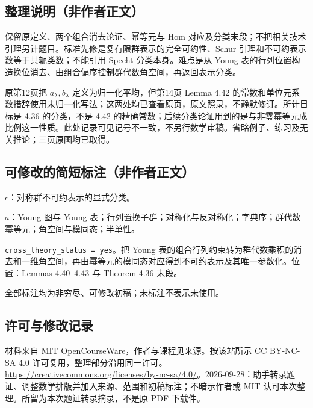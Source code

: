 \documentclass[UTF8,11pt]{ctexart}
\theoremstyle{definition}
\begin{document}
\subsection*{整理说明（非作者正文）}
保留原定义、两个组合消去论证、幂等元与 Hom 对应及分类末段；不把相关技术引理另计题目。标准先修是复有限群表示的完全可约性、Schur 引理和不可约表示数等于共轭类数；不能引用 Specht 分类本身。难点是从 Young 表的行列位置构造换位消去、由组合偏序控制群代数角空间，再返回表示分类。

原第12页把 $a_\lambda,b_\lambda$ 定义为归一化平均，但第14页 Lemma 4.42 的常数和单位元系数措辞使用未归一化写法；这两处均已查看原页，原文照录，不静默修订。所计目标是 4.36 的分类，不是 4.42 的精确常数；后续分类论证用到的是与非零幂等元成比例这一性质。此处记录可见记号不一致，不另行数学审稿。省略例子、练习及无关推论；三页原图均已取得。
\subsection*{可修改的简短标注（非作者正文）}
$c$：对称群不可约表示的显式分类。

$a$：Young 图与 Young 表；行列置换子群；对称化与反对称化；字典序；群代数幂等元；角空间与模同态；半单性。

\texttt{cross\_theory\_status = yes}。把 Young 表的组合行列约束转为群代数乘积的消去和一维角空间，再由幂等元的模同态对应得到不可约表示及其唯一参数化。位置：Lemmas 4.40--4.43 与 Theorem 4.36 末段。

全部标注均为非穷尽、可修改初稿；未标注不表示未使用。
\subsection*{许可与修改记录}
材料来自 MIT OpenCourseWare，作者与课程见来源。按该站所示 CC BY-NC-SA 4.0 许可复用，整理部分沿用同一许可。\url{https://creativecommons.org/licenses/by-nc-sa/4.0/}。2026-09-28：助手转录题证、调整数学排版并加入来源、范围和初稿标注；不暗示作者或 MIT 认可本次整理。所留为本次题证转录摘录，不是原 PDF 下载件。
\end{document}
